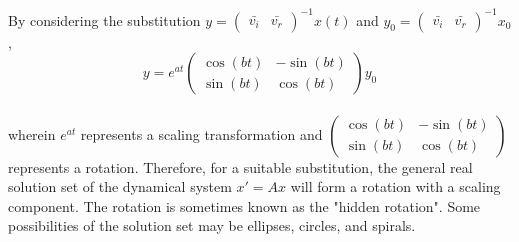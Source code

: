 By considering the substitution $\displaystyle{y = \begin{pmatrix}\bar{v_i} & \bar{v_r} \end{pmatrix}^{-1}x(t)}$ and $\displaystyle{y_0 = \begin{pmatrix}\bar{v_i} & \bar{v_r} \end{pmatrix}^{-1}  x_0}$,
$$y = e^{at} \begin{pmatrix} \cos{(bt)}& -\sin{(bt)} \\ \sin{(bt)}& \cos{(bt)} \end{pmatrix} y_0$$
\\wherein $e^{at}$ represents a scaling transformation and $\displaystyle{\begin{pmatrix} \cos{(bt)}& -\sin{(bt)} \\ \sin{(bt)}& \cos{(bt)} \end{pmatrix}}$ represents a rotation. Therefore, for a suitable substitution, the general real solution set of the dynamical system $\displaystyle{x' = Ax}$ will form a rotation with a scaling component. The rotation is sometimes known as the "hidden rotation". Some possibilities of the solution set may be ellipses, circles, and spirals. 
